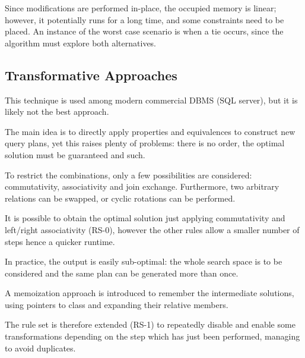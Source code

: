 Since modifications are performed in-place, the occupied memory is linear; however, it potentially runs for a long time, and some constraints need to be placed. An instance of the worst case scenario is when a tie occurs, since the algorithm must explore both alternatives. 

\subsection{Transformative Approaches}
This technique is used among modern commercial DBMS (SQL server), but it is likely not the best approach. 

The main idea is to directly apply properties and equivalences to construct new query plans, yet this raises plenty of problems: there is no order, the optimal solution must be guaranteed and such. 

To restrict the combinations, only a few possibilities are considered: commutativity, associativity and join exchange. Furthermore, two arbitrary relations can be swapped, or cyclic rotations can be performed. 

It is possible to obtain the optimal solution just applying commutativity and left/right associativity (RS-0), however the other rules allow a smaller number of steps hence a quicker runtime.

In practice, the output is easily sub-optimal: the whole search space is to be considered and the same plan can be generated more than once. 

A memoization approach is introduced to remember the intermediate solutions, using pointers to class and expanding their relative members.

The rule set is therefore extended (RS-1) to repeatedly disable and enable some transformations depending on the step which has just been performed, managing to avoid duplicates. 



